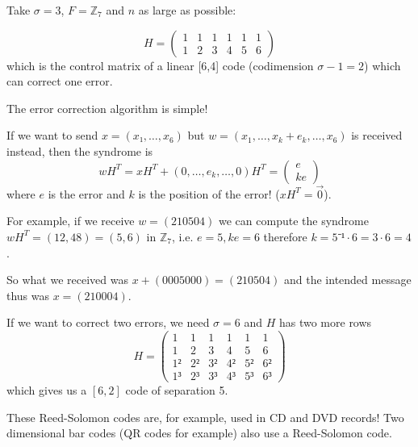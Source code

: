 \documentclass[english]{lbscript}
\begin{document}
\begin{example}{}{}
	Take \(𝜎=3\), \(F=ℤ_{7}\) and \(n\) as large as possible:

	\begin{equation}
		\label{eq:158}
		H = \begin{pmatrix}
			1 & 1 & 1 & 1 & 1 & 1 \\
			1 & 2 & 3 & 4 & 5 & 6
		\end{pmatrix}
	\end{equation}
	which is the control matrix of a linear [6,4] code (codimension \(𝜎-1=2\)) which can correct one error.

	The error correction algorithm is simple!

	If we want to send \(x=(x₁, \dots, x_6)\) but \(w=(x_1, \dots, x_k+e_k, \dots, x_6)\) is received instead, then the syndrome is
	\begin{equation}
		\label{eq:159}
		wH^{T} = xH^{T} + (0, \dots, e_k, \dots, 0)H^{T} = \begin{pmatrix}
			e \\
			ke
		\end{pmatrix}
	\end{equation}
	where \(e\) is the error and \(k\) is the position of the error! (\(xH^{T}=\vec{0}\)).

	For example, if we receive \(w=(210504)\) we can compute the syndrome \(wH^{T}= (12, 48)= (5, 6)\) in \(ℤ_{7}\), i.e. \(e=5, ke=6\) therefore \(k=5⁻¹⋅6=3⋅6=4\).

	So what we received was \(x+ (0005000) = (210504)\) and the intended message thus was \(x=(210004)\).

	If we want to correct two errors, we need \(𝜎=6\) and \(H\) has two more rows
	\begin{equation}
		\label{eq:160}
		H= \begin{pmatrix}
			1  & 1  & 1  & 1  & 1  & 1  \\
			1  & 2  & 3  & 4  & 5  & 6  \\
			1² & 2² & 3² & 4² & 5² & 6² \\
			1³ & 2³ & 3³ & 4³ & 5³ & 6³
		\end{pmatrix}
	\end{equation}
	which gives us a \([6,2]\) code of separation 5.
\end{example}
These Reed-Solomon codes are, for example, used in CD and DVD records! Two dimensional bar codes (QR codes for example) also use a Reed-Solomon code.
\end{document}
